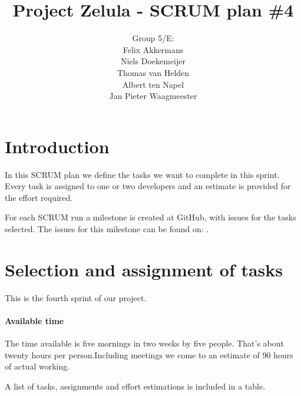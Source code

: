 \documentclass[a4paper]{article}
\title{Project Zelula - SCRUM plan \#4}
\author{Group 5/E:\\
Felix Akkermans \\
Niels Doekemeijer \\
Thomas van Helden \\
Albert ten Napel \\
Jan Pieter Waagmeester}
\begin{document}
\maketitle

\section{Introduction}
In this SCRUM plan we define the tasks we want to complete in this sprint. Every task is assigned to one or two developers and an estimate is provided for the effort required.

For each SCRUM run a milestone is created at GitHub, with issues for the tasks selected. The issues for this milestone can be found on: .

\section{Selection and assignment of tasks}
This is the fourth sprint of our project. 

\paragraph{Available time}
The time available is five  mornings in two weeks by five people. That's about twenty hours per person.Including meetings we come to an estimate of 90 hours of actual working. 

A list of tasks, assignments and effort estimations is included in a table.
\end{document}
